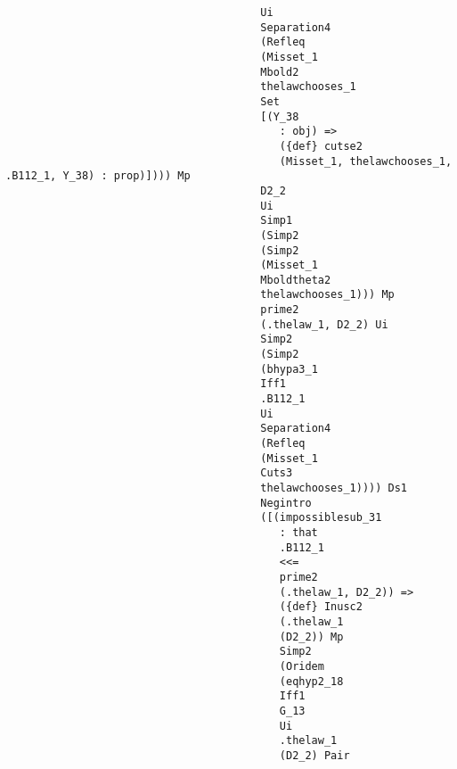 \documentclass[12pt]{article}
\begin{document}
\begin{verbatim}
                                        Ui 
                                        Separation4 
                                        (Refleq 
                                        (Misset_1 
                                        Mbold2 
                                        thelawchooses_1 
                                        Set 
                                        [(Y_38 
                                           : obj) => 
                                           ({def} cutse2 
                                           (Misset_1, thelawchooses_1, .B112_1, Y_38) : prop)]))) Mp 
                                        D2_2 
                                        Ui 
                                        Simp1 
                                        (Simp2 
                                        (Simp2 
                                        (Misset_1 
                                        Mboldtheta2 
                                        thelawchooses_1))) Mp 
                                        prime2 
                                        (.thelaw_1, D2_2) Ui 
                                        Simp2 
                                        (Simp2 
                                        (bhypa3_1 
                                        Iff1 
                                        .B112_1 
                                        Ui 
                                        Separation4 
                                        (Refleq 
                                        (Misset_1 
                                        Cuts3 
                                        thelawchooses_1)))) Ds1 
                                        Negintro 
                                        ([(impossiblesub_31 
                                           : that 
                                           .B112_1 
                                           <<= 
                                           prime2 
                                           (.thelaw_1, D2_2)) => 
                                           ({def} Inusc2 
                                           (.thelaw_1 
                                           (D2_2)) Mp 
                                           Simp2 
                                           (Oridem 
                                           (eqhyp2_18 
                                           Iff1 
                                           G_13 
                                           Ui 
                                           .thelaw_1 
                                           (D2_2) Pair 

\end{verbatim}
\end{document}
